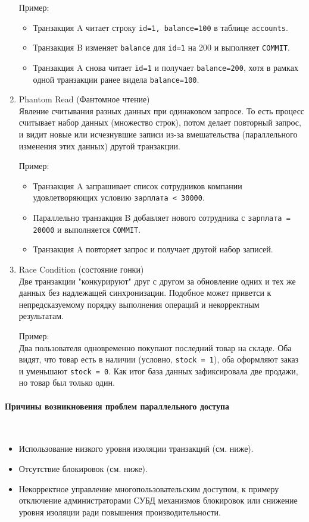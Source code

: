 \begin{enumerate}
    Пример:
    \begin{itemize}
        \item Транзакция A читает строку \texttt{id=1, balance=100} в таблице \texttt{accounts}.
        \item Транзакция B изменяет \texttt{balance} для \texttt{id=1} на 200 и выполняет \texttt{COMMIT}.
        \item Транзакция A снова читает \texttt{id=1} и получает \texttt{balance=200}, хотя в рамках одной транзакции ранее видела \texttt{balance=100}.
    \end{itemize}

    \item Phantom Read (Фантомное чтение) ~\\ 
    Явление считывания разных данных при одинаковом запросе. То есть процесс считывает набор данных (множество строк), потом делает повторный запрос, и видит новые или исчезнувшие записи из-за вмешательства (параллельного изменения этих данных) другой транзакции.

    Пример:
    \begin{itemize}
        \item Транзакция A запрашивает список сотрудников компании удовлетворяющих условию \texttt{зарплата < 30000}.
        \item Параллельно транзакция B добавляет нового сотрудника с \texttt{зарплата = 20000} и выполняется \texttt{COMMIT}.
        \item Транзакция A повторяет запрос и получает другой набор записей.
    \end{itemize}

    \item Race Condition (состояние гонки) ~\\
    Две транзакции "конкурируют" друг с другом за обновление одних и тех же данных без надлежащей синхронизации. Подобное может приветси к непредсказуемому порядку выполнения операций и некорректным результатам.

    Пример: ~\\
    Два пользователя одновременно покупают последний товар на складе. Оба видят, что товар есть в наличии (условно, \texttt{stock = 1}), оба оформляют заказ и уменьшают \texttt{stock = 0}. Как итог база данных зафиксировала две продажи, но товар был только один.

\end{enumerate}

\paragraph{Причины возникновения проблем параллельного доступа} ~\\
\begin{itemize}
    \item Использование низкого уровня изоляции транзакций (см. ниже).
    \item Отсутствие блокировок (см. ниже).
    \item Некорректное управление многопользовательским доступом, к примеру отключение администраторами СУБД механизмов блокировок или снижение уровня изоляции ради повышения производительности.
\end{itemize}

